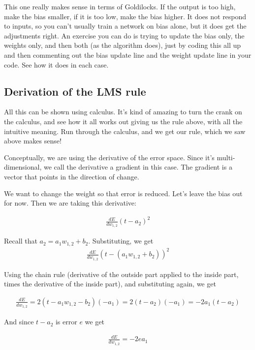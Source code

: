 This one really makes sense in terms of Goldilocks. If the output is too high, make the bias smaller, if it is too low, make the bias higher. It does not respond to inputs, so you can't usually train a network on bias alone, but it does get the adjustments right. An exercise you can do is trying to update the bias only, the weights only, and then both (as the algorithm does), just by coding this all up and then commenting out the bias update line and the weight update line in your code. See how it does in each case.

\subsection{Derivation of the LMS rule}

All this can be shown using calculus. It's kind of amazing to turn the crank on the calculus, and see how it all works out giving us the rule above, with all the intuitive meaning. Run through the calculus, and we get our rule, which we saw above makes sense!

Conceptually, we are using the derivative of the error space. Since it's multi-dimensional, we call the derivative a gradient in this case. The gradient is a vector that points in the direction of change. 

We want to change the weight so that error is reduced. Let's leave the bias out for now. Then we are taking this derivative:

\begin{eqnarray*}
\frac{dE}{dw_{1,2}} (t - a_2)^2
\end{eqnarray*}

Recall that $a_2 =  a_1 w_{1,2} + b_2$. Substituting, we get
\begin{eqnarray*}
\frac{dE}{dw_{1,2}} (t - ( a_1 w_{1,2} + b_2))^2 
\end{eqnarray*}

Using the chain rule (derivative of the outside part applied to the inside part, times the derivative of the inside part), and substituting again, we get

\begin{eqnarray*}
\frac{dE}{dw_{1,2}} = 2 (t - a_1 w_{1,2} - b_2) (-a_1) =   2 (t - a_2) (-a_1)  = -2 a_1 (t - a_2)
\end{eqnarray*}

And since $t - a_2$ is error $e$ we get

\begin{eqnarray*}
\frac{dE}{dw_{1,2}} = -2 e a_1
\end{eqnarray*}

